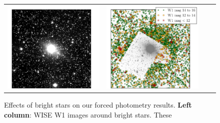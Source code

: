\documentclass[12pt,preprint]{aastex}
\begin{document}
\begin{figure}
\begin{center}
\begin{tabular}{@{}c@{\spc}c@{\spc}c@{\spc}c@{}}
      \includegraphics[width=\figw]{bright-38} &
      \includegraphics[width=\figw]{bright-39} \\
    \end{tabular}
  \end{center}
  \caption{Effects of bright stars on our forced photometry results.
    \textbf{Left column}: WISE W1 images around bright stars.  These
}
\end{figure}
\end{document}
